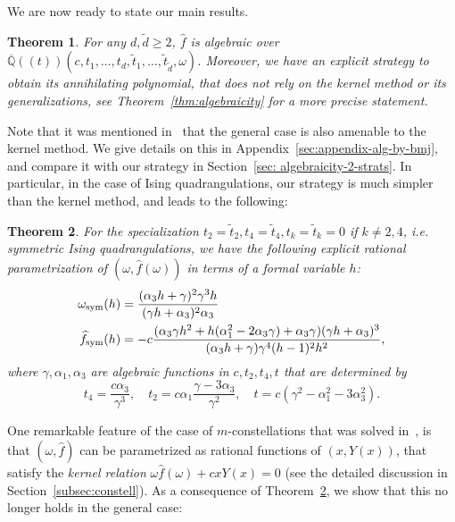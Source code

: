 \documentclass{scrartcl}
\newcommand{\QQ}{\overline{\mathbb{Q}}}
\newcommand\wt[1]{\widetilde{#1}}
\newcommand\wh[1]{\widehat{#1}}
\newtheorem{thm}{Theorem}[section]
\begin{document}
We are now ready to state our main results.

\begin{thm}
For any $d, \wt d\geq2$, $\wh{f}$ is algebraic over $\QQ((t))(c,t_1,\dots,t_d,\wt{t}_1,\dots,\wt{t}_{\wt d},\omega)$. Moreover, we have an explicit strategy to obtain its annihilating polynomial, that does not rely on the kernel method or its generalizations, see Theorem~\ref{thm:algebraicity} for a more precise statement.
\end{thm}

Note that it was mentioned in~\cite{bouttier-carrance} that the general case is also amenable to the kernel method. We give details on this in Appendix~\ref{sec:appendix-alg-by-bmj}, and compare it with our strategy in Section~\ref{sec: algebraicity-2-strats}. In particular, in the case of Ising quadrangulations, our strategy is much simpler than the kernel method, and leads to the following:

\begin{thm} For the specialization $t_2=\wt{t}_2, t_4=\wt{t}_4, t_k=\wt{t}_k=0$ if $k\neq 2, 4$, i.e. symmetric Ising quadrangulations, we have the following explicit rational parametrization of $(\omega,\wh{f}(\omega))$ in terms of a formal variable $h$:
\begin{equation}
\begin{aligned}
\omega_\textnormal{sym}(h) &= \frac{(\alpha_3 h +\gamma)^2\gamma^3h}{(\gamma h + \alpha_3)^2\alpha_3}\\
\widehat{f}_\textnormal{sym}(h) &=-c\frac{(\alpha_3 \gamma h^2 + h(\alpha_1^2 - 2\alpha_3\gamma) + \alpha_3 \gamma) (\gamma h +\alpha_3)^3}{(\alpha_3 h + \gamma) \gamma^4 (h - 1)^2h^2},
\end{aligned}
\label{eq:parametrization-for-Ising-quadrangulations-symmetric-f-omega}
\end{equation}
where $\gamma, \alpha_1, \alpha_3$ are algebraic functions in $c,t_2,t_4,t$ that are determined by 
\[
t_4  = \frac{c \alpha_3}{\gamma^3} , \quad t_2  = c\alpha_1\frac{\gamma - 3\alpha_3}{\gamma^2}, \quad t= c(\gamma^2-\alpha_1^2-3\alpha_3^2).
\]
\label{thm:ratio-param-Ising-quad-sym}
\end{thm}

One remarkable feature of the case of $m$-constellations that was solved in~\cite{bouttier-carrance}, is that $(\omega,\wh{f})$ can be parametrized as rational functions of $(x,Y(x))$, that satisfy the \emph{kernel relation} $\omega\wh{f}(\omega)+cxY(x)=0$ (see the detailed discussion in Section~\ref{subsec:constell}). As a consequence of Theorem~\ref{thm:ratio-param-Ising-quad-sym}, we show that this no longer holds in the general case:
\end{document}
